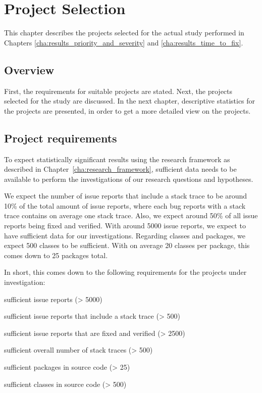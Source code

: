 
\chapter{Project Selection} %
\label{cha:project_selection}
This chapter describes the projects selected for the actual study performed in Chapters \ref{cha:results_priority_and_severity} and \ref{cha:results_time_to_fix}. 

\section{Overview} %
First, the requirements for suitable projects are stated. Next, the projects selected for the study are discussed. In the next chapter, descriptive statistics for the projects are presented, in order to get a more detailed view on the projects.

\section{Project requirements} %
\label{sec:project_requirements}
To expect statistically significant results using the research framework as described in Chapter~\ref{cha:research_framework}, sufficient data needs to be available to perform the investigations of our research questions and hypotheses. 

We expect the number of issue reports that include a stack trace to be around 10\% of the total amount of issue reports, where each bug reports with a stack trace contains on average one stack trace. Also, we expect around 50\% of all issue reports being fixed and verified. With around 5000 issue reports, we expect to have sufficient data for our investigations. Regarding classes and packages, we expect 500 classes to be sufficient. With on average 20 classes per package, this comes down to 25 packages total. 

In short, this comes down to the following requirements for the projects under investigation:

\begin{itemize*}
	\item sufficient issue reports (> 5000)
	\item sufficient issue reports that include a stack trace (> 500)
	\item sufficient issue reports that are fixed and verified (> 2500)
	\item sufficient overall number of stack traces (> 500)
	\item sufficient packages in source code (> 25)
	\item sufficient classes in source code (> 500)
\end{itemize*}

